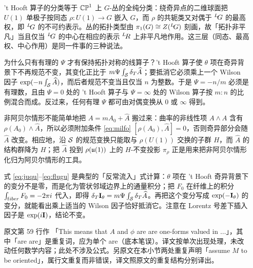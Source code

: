 \begin{yizhu}[物理图像]
't Hooft 算子的分类等于 $\Bbb{CP}^1$ 上 $G$-丛的全纯分类：绕奇异点的二维球面把 $U(1)$ 单极子按同态 $\rho:U(1)\to G$ 嵌入 $G$，而 $\rho$ 的共轭类又对偶于 $^L\negthinspace G$ 的最高权，即 $^L\negthinspace G$ 的不可约表示。丛的拓扑类型由 $\pi_1(G)\cong Z(^L\negthinspace G)$ 刻画，故「拓扑非平凡」当且仅当 $^L\negthinspace G$ 的中心在相应的表示 $^L\negthinspace R$ 上非平凡地作用。这三层（同态、最高权、中心作用）是同一件事的三种说法。
\end{yizhu}

\begin{yizhu}[含糊点拨]
为什么只有有理的 $\Psi$ 才有保持拓扑对称的线算子？'t Hooft 算子使 $\theta$ 项在奇异背景下不再规范不变，其变化正比于 $m\Psi\int_{{\cal S}}\delta_T\hat A$；要抵消它必须乘上一个 Wilson 因子 $\exp(-n\int_{{\cal S}}\hat A)$，而后者规范不变当且仅当 $n$ 为整数。于是 $\Psi=-n/m$ 必须是有理数，且由 $\Psi=0$ 处的 't Hooft 算子与 $\Psi=\infty$ 处的 Wilson 算子按 $m:n$ 的比例混合而成。反过来，任何有理 $\Psi$ 都可由对偶变换从 $0$ 或 $\infty$ 得到。
\end{yizhu}

\begin{yizhu}[易错点]
非阿贝尔情形不能简单地把 $A=mA_0+\hat A$ 搬过来：曲率的非线性项 $A\wedge A$ 含有 $\rho(A_0)\wedge\hat A$，所以必须附加条件 \eqref{eq:milfo} $[\rho(A_0),\hat A]=0$，否则奇异部分会随 $\hat A$ 改变。相应地，沿 ${{\cal S}}$ 的规范变换只能取与 $\rho(U(1))$ 交换的子群 $H$，而 $\hat A$ 的结构群降为 $H$；把 $\hat A$ 投到 $\rho(\frak{u}(1))$ 上的 $H$-不变投影 $\pi_\rho$ 正是用来把非阿贝尔情形化归为阿贝尔情形的工具。
\end{yizhu}

\begin{yizhu}[物理图像]
式 \eqref{eq:juqu}--\eqref{eq:flugu} 是典型的「反常流入」式计算：$\theta$ 项在 't Hooft 奇异背景下的变分不是零，而是化为管状邻域边界上的通量积分；把 $F_0$ 在纤维上的积分 $\int_{\rm fiber}F_0=-2\pi i$ 代入，即得 $\delta_T{{\cmmib I}}_\theta=m\Psi\int_{{\cal S}}\delta_T\hat A$。再把这个变分写成 $\exp(-{{\cmmib I}}_\theta)$ 的变分，就能看出乘上适当的 Wilson 因子恰好抵消它。注意在 Lorentz 号差下插入因子是 $\exp(i{{\cmmib I}})$，结论不变。
\end{yizhu}

\begin{yizhu}[原文疑误]
原文第 59 行作 「This means that $A$ and $\phi$ are are one-forms valued in ...」，其中「are are」是重复词，应为单个 are（底本笔误）。译文按单次出现处理，未改动任何数学内容；此处不涉及公式。另原文在本小节两处重复声明「assume $M$ to be oriented」，属行文重复而非错误，译文照原文的重复结构分别译出。
\end{yizhu}
